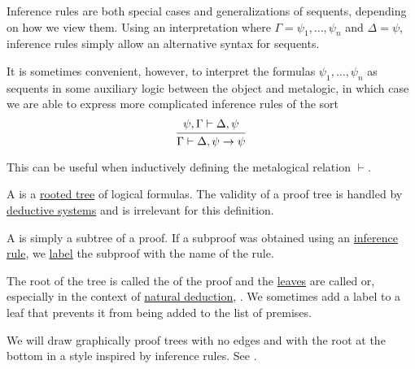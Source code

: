 \begin{remark}\label{rem:sequents_inference_rules}
  Inference rules are both special cases and generalizations of sequents, depending on how we view them. Using an interpretation where \( \Gamma = \psi_1, \ldots, \psi_n \) and \( \Delta = \psi \), inference rules simply allow an alternative syntax for sequents.

  It is sometimes convenient, however, to interpret the formulas \( \psi_1, \ldots, \psi_n \) as sequents in some auxiliary logic between the object and metalogic, in which case we are able to express more complicated inference rules of the sort
  \begin{equation*}
    \begin{prooftree}
      \hypo{ \psi, \Gamma \vdash \Delta, \psi }
      \infer1{ \Gamma \vdash \Delta, \psi \to \psi }
    \end{prooftree}
  \end{equation*}

  This can be useful when inductively defining the metalogical relation \( \vdash \).
\end{remark}

\begin{definition}\label{def:proof_tree}\mimprovised
  A  is a \hyperref[def:rooted_tree]{rooted tree} of logical formulas. The validity of a proof tree is handled by \hyperref[def:deductive_system]{deductive systems} and is irrelevant for this definition.

  \begin{thmenum}
     A  is simply a subtree of a proof. If a subproof was obtained using an \hyperref[def:judgment/inference_rule]{inference rule}, we \hyperref[def:labeled_set]{label} the subproof with the name of the rule.

     The root of the tree is called the  of the proof and the \hyperref[def:rooted_tree/leaf]{leaves} are called  or, especially in the context of \hyperref[def:natural_deduction_system]{natural deduction}, . We sometimes add a  label to a leaf that prevents it from being added to the list of premises.

     We will draw graphically proof trees with no edges and with the root at the bottom in a style inspired by inference rules. See .
  \end{thmenum}
\end{definition}

